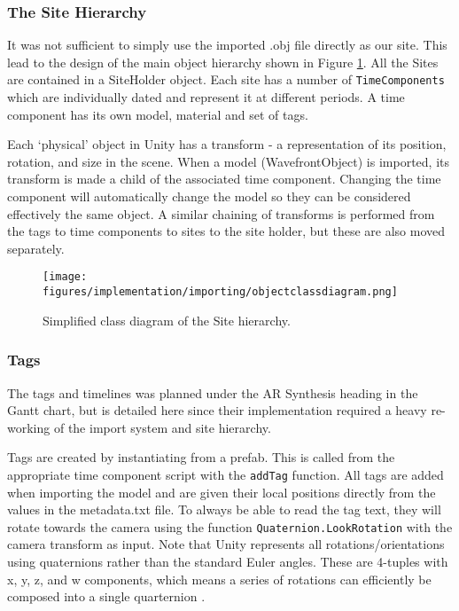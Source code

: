 \documentclass[12pt, a4paper]{article}
\begin{document}
\subsubsection{The Site Hierarchy}
It was not sufficient to simply use the imported .obj file directly as our site. This lead to the design of the main object hierarchy shown in Figure \ref{fig:hierarchydiagram}. All the Sites are contained in a SiteHolder object. Each site has a number of \verb|TimeComponents| which are individually dated and represent it at different periods. A time component has its own model, material and set of tags. 

Each `physical' object in Unity has a transform - a representation of its position, rotation, and size in the scene. When a model (WavefrontObject) is imported, its transform is made a child of the associated time component. Changing the time component will automatically change the model so they can be considered effectively the same object. A similar chaining of transforms is performed from the tags to time components to sites to the site holder, but these are also moved separately.

\begin{figure}[]
    \centering
    \texttt{[image: figures/implementation/importing/objectclassdiagram.png]}
        \caption{Simplified class diagram of the Site hierarchy.}
        \label{fig:hierarchydiagram}
\end{figure}

\subsubsection{Tags}
The tags and timelines was planned under the AR Synthesis heading in the Gantt chart, but is detailed here since their implementation required a heavy re-working of the import system and site hierarchy. 

Tags are created by instantiating from a prefab. This is called from the appropriate time component script with the \verb|addTag| function. All tags are added when importing the model and are given their local positions directly from the values in the metadata.txt file.
\newpage
To always be able to read the tag text, they will rotate towards the camera using the function \verb|Quaternion.LookRotation| with the camera transform as input. Note that Unity represents all rotations/orientations using quaternions rather than the standard Euler angles. These are 4-tuples with x, y, z, and w components, which means a series of rotations can efficiently be composed into a single quarternion \cite{models:quaternions}.
\end{document}
